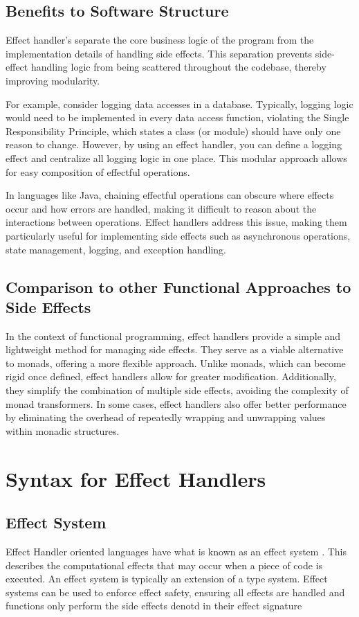 \documentclass[logo,bsc,singlespacing,parskip]{infthesis}
\begin{document}
\subsection{Benefits to Software Structure}

Effect handler’s separate the core business logic of the program from the implementation details of handling side effects. This separation prevents side-effect handling logic from being scattered throughout the codebase, thereby improving modularity. 

For example, consider logging data accesses in a database. Typically, logging logic would need to be implemented in every data access function, violating the Single Responsibility Principle, which states a class (or module) should have only one reason to change. However, by using an effect handler, you can define a logging effect and centralize all logging logic in one place. This modular approach allows for easy composition of effectful operations. 

In languages like Java, chaining effectful operations can obscure where effects occur and how errors are handled, making it difficult to reason about the interactions between operations. Effect handlers address this issue, making them particularly useful for implementing side effects such as asynchronous operations, state management, logging, and exception handling. 

\subsection{Comparison to other Functional Approaches to Side Effects}
In the context of functional programming, effect handlers provide a simple and lightweight method for managing side effects. They serve as a viable alternative to monads, offering a more flexible approach. Unlike monads, which can become rigid once defined, effect handlers allow for greater modification. Additionally, they simplify the combination of multiple side effects, avoiding the complexity of monad transformers. In some cases, effect handlers also offer better performance by eliminating the overhead of repeatedly wrapping and unwrapping values within monadic structures. 


\section{Syntax for Effect Handlers}

\subsection{Effect System}
Effect Handler oriented languages have what is known as an effect system \cite{bauer_effect_2013}. This describes the computational effects that may occur when a piece of code is executed. An effect system is typically an extension of a type system. Effect systems can be used to enforce effect safety, ensuring all effects are handled and functions only perform the side effects denotd in their effect signature
\end{document}
